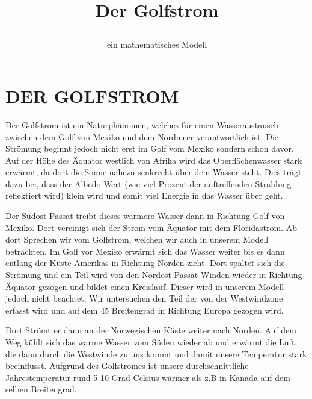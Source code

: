 \documentclass[a4paper,twoside]{article}
\begin{document}
	\title{Der Golfstrom\subtitle{ein mathematisches Modell} }
	
	\author{}
	

	
	\onecolumn \maketitle \normalsize \vfill

	\section{\uppercase{Der Golfstrom}}\label{sec:Golfstrom}

	\noindent Der Golfstrom ist ein Naturphänomen, welches für einen Wasseraustausch zwischen dem Golf von Mexiko und dem Nordmeer verantwortlich ist. Die Strömung beginnt jedoch nicht erst im Golf vom Mexiko sondern schon davor. Auf der Höhe des Äquator westlich von Afrika wird das Oberflächenwasser stark erwärmt, da dort die Sonne nahezu senkrecht über dem Wasser steht. Dies trägt dazu bei, dass der Albedo-Wert (wie viel Prozent der auftreffenden Strahlung reflektiert wird) klein wird und somit viel Energie in das Wasser über geht.

	Der Südost-Passat treibt dieses wärmere Wasser dann in Richtung Golf von Mexiko. Dort vereinigt sich der Strom vom Äquator mit dem Floridastrom. Ab dort Sprechen wir vom Golfstrom, welchen wir auch in unserem Modell betrachten. Im Golf vor Mexiko erwärmt sich das Wasser weiter bis es dann entlang der Küste Amerikas in Richtung Norden zieht. Dort spaltet sich die Strömung und ein Teil wird von den Nordost-Passat Winden wieder in Richtung Äquator gezogen und bildet einen Kreislauf. Dieser wird in unserem Modell jedoch nicht beachtet. Wir untersuchen den Teil der von der Westwindzone erfasst wird und auf dem 45 Breitengrad in Richtung Europa gezogen wird.

	Dort Strömt er dann an der Norwegischen Küste weiter nach Norden. Auf dem Weg kühlt sich das warme Wasser vom Süden wieder ab und erwärmt die Luft, die dann durch die Westwinde zu uns kommt und damit unsere Temperatur stark beeinflusst. Aufgrund des Golfstromes ist unsere durchschnittliche Jahrestemperatur rund 5-10 Grad Celsius wärmer als z.B in Kanada auf dem selben Breitengrad. 
\end{document}
